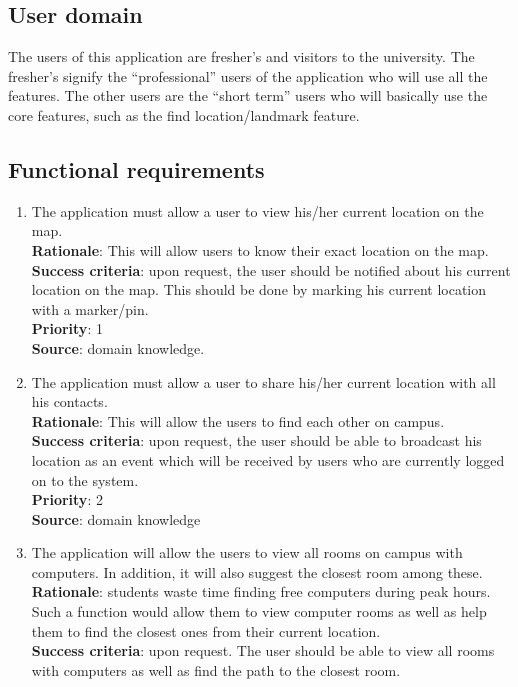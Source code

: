 \documentclass[10pt,a4paper,oneside]{report}
\begin{document}
\subsection*{User domain}
The users of this application are fresher’s and visitors  to the university.  The fresher’s signify the “professional” users of the application who will use all the features. The other users are the “short term” users who will basically use the core features, such as the find location/landmark feature.

\subsection*{Functional requirements}
\small{
\begin{enumerate}
\item{The application must allow a user to view his/her current location on the map. \\
  \textbf{Rationale}: This will allow users to know their exact location on the map.\\
  \textbf{Success criteria}: upon request, the user should be notified about his current location on the map. This should be done by marking his current location with a marker/pin.\\
  \textbf{Priority}: 1\\
  \textbf{Source}: domain knowledge.\\
}
\item{The application must allow a user to share his/her current location with all his contacts. \\
  \textbf{Rationale}: This will allow the users to find each other on campus.\\
  \textbf{Success criteria}: upon request, the user should be able to broadcast his location as an event which will be received by users who are currently logged on to the system.\\
  \textbf{Priority}: 2\\
  \textbf{Source}: domain knowledge
}
\item{The application will allow the users to view all rooms on campus with computers. In addition, it will also suggest the closest room among these. \\
  \textbf{Rationale}: students waste time finding free computers during peak hours. Such a function would allow them to view computer rooms as well as help them to find the closest ones from their current location.\\
  \textbf{Success criteria}: upon request. The user should be able to view all rooms with computers as well as find the path to the closest room.\\
}
\end{enumerate}}
\end{document}
